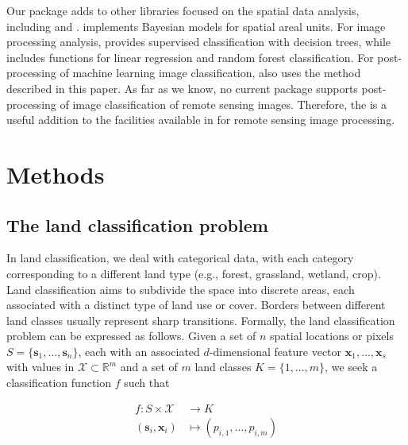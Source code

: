 \documentclass[
  shortnames]{jss}
\begin{document}
Our package adds to other  libraries focused on the spatial data analysis, including  \citep{Bivand2023} and  \citep{Li2022}.  \citep{Lee2013} implements Bayesian models for spatial areal units. For image processing analysis,  \citep{Hijmans2023} provides supervised classification with decision trees, while  \citep{Bivand2023} includes functions for linear regression and random forest classification. For post-processing of machine learning image classification,  also uses the method described in this paper. As far as we know, no current  package supports post-processing of image classification of remote sensing images. Therefore, the  is a useful addition to the facilities available in  for remote sensing image processing.

\hypertarget{methods}{%
\section{Methods}\label{methods}}

\hypertarget{the-land-classification-problem}{%
\subsection{The land classification problem}\label{the-land-classification-problem}}

In land classification, we deal with categorical data, with each category corresponding to a different land type (e.g., forest, grassland, wetland, crop). Land classification aims to subdivide the space into discrete areas, each associated with a distinct type of land use or cover. Borders between different land classes usually represent sharp transitions. Formally, the land classification problem can be expressed as follows. Given a set of \(n\) spatial locations or pixels \(S = \{ \mathbf{s}_1, \ldots, \mathbf{s}_n \}\), each with an associated \(d\)-dimensional feature vector \(\mathbf{x}_1, \ldots, \mathbf{x}_s\) with values in \(\mathcal{X} \subset \mathbb{R}^m\) and a set of \(m\) land classes \(K = \{ 1, ..., m \}\), we seek a classification function \(f\) such that

\begin{align}
f\colon S \times \mathcal{X} & \longrightarrow K \nonumber \\
(\mathbf{s}_i, \mathbf{x}_i) & \longmapsto (p_{i,1}, \ldots, p_{i,m}) 
\label{eq:classificationf}
\end{align}
\end{document}
